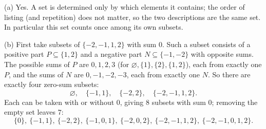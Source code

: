 (a) Yes. A set is determined only by which elements it contains; the order of listing (and repetition) does not matter, so the two descriptions are the same set. In particular this set counts once among its own subsets.

(b) First take subsets of $\{-2,-1,1,2\}$ with sum $0$. Such a subset consists of a positive part $P\subseteq\{1,2\}$ and a negative part $N\subseteq\{-1,-2\}$ with opposite sums. The possible sums of $P$ are $0,1,2,3$ (for $\varnothing,\{1\},\{2\},\{1,2\}$), each from exactly one $P$, and the sums of $N$ are $0,-1,-2,-3$, each from exactly one $N$. So there are exactly four zero-sum subsets:
\[
\varnothing,\quad\{-1,1\},\quad\{-2,2\},\quad\{-2,-1,1,2\}.
\]
Each can be taken with or without $0$, giving $8$ subsets with sum $0$; removing the empty set leaves $\boxed{7}$:
\[
\{0\},\ \{-1,1\},\ \{-2,2\},\ \{-1,0,1\},\ \{-2,0,2\},\ \{-2,-1,1,2\},\ \{-2,-1,0,1,2\}.
\]
